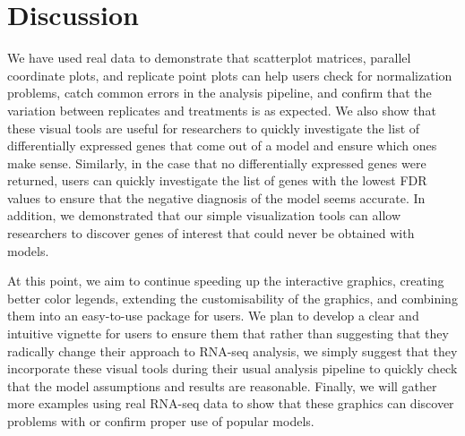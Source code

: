 \documentclass[referee]{biom}
\begin{document}
\section{Discussion}
\label{s:discuss}

We have used real data to demonstrate that scatterplot matrices, parallel coordinate plots, and replicate point plots can help users check for normalization problems, catch common errors in the analysis pipeline, and confirm that the variation between replicates and treatments is as expected. We also show that these visual tools are useful for researchers to quickly investigate the list of differentially expressed genes that come out of a model and ensure which ones make sense. Similarly, in the case that no differentially expressed genes were returned, users can quickly investigate the list of genes with the lowest FDR values to ensure that the negative diagnosis of the model seems accurate. In addition, we demonstrated that our simple visualization tools can allow researchers to discover genes of interest that could never be obtained with models.

At this point, we aim to continue speeding up the interactive graphics, creating better color legends, extending the customisability of the graphics, and combining them into an easy-to-use package for users. We plan to develop a clear and intuitive vignette for users to ensure them that rather than suggesting that they radically change their approach to RNA-seq analysis, we simply suggest that they incorporate these visual tools during their usual analysis pipeline to quickly check that the model assumptions and results are reasonable. Finally, we will gather more examples using real RNA-seq data to show that these graphics can discover problems with or confirm proper use of popular models.



\backmatter



\end{document}
